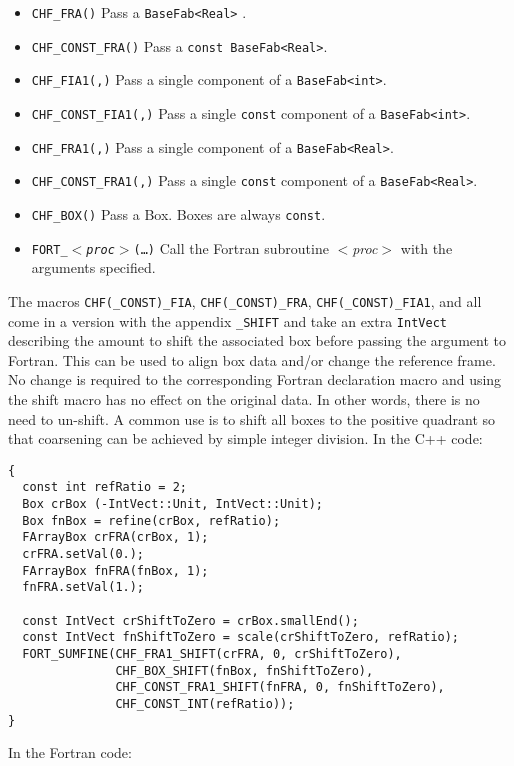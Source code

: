 \begin{itemize}
\item {\tt CHF\_FRA(\argv)} Pass a {\verb/BaseFab<Real>/} .
\item {\tt CHF\_CONST\_FRA(\argv)} Pass a {\verb/const BaseFab<Real>/}.
\item {\tt CHF\_FIA1(\argv,\compv)} Pass a single component of a {\verb/BaseFab<int>/}.
\item {\tt CHF\_CONST\_FIA1(\argv,\compv)} Pass a single {\tt const} component of a {\verb/BaseFab<int>/}.
\item {\tt CHF\_FRA1(\argv,\compv)} Pass a single component of a {\verb/BaseFab<Real>/}.
\item {\tt CHF\_CONST\_FRA1(\argv,\compv)} Pass a single {\tt const} component of a {\verb/BaseFab<Real>/}.
\item {\tt CHF\_BOX(\argv)} Pass a Box.  Boxes are always {\tt const}.
\item {\tt FORT\_$<${\em proc}$>$(\ldots)} Call the Fortran subroutine $<${\em proc}$>$ with the arguments specified.
\end{itemize}

The macros {\tt CHF(\_CONST)\_FIA}, {\tt CHF(\_CONST)\_FRA}, {\tt CHF(\_CONST)\_FIA1}, and all come in a version with the appendix {\tt \_SHIFT} and take an extra {\tt IntVect} describing the amount to shift the associated box before passing the argument to Fortran.  This can be used to align box data and/or change the reference frame.  No change is required to the corresponding Fortran declaration macro and using the shift macro has no effect on the original data.  In other words, there is no need to un-shift.  A common use is to shift all boxes to the positive quadrant so that coarsening can be achieved by simple integer division.  In the C++ code:

\begin{small}
\begin{verbatim}
{
  const int refRatio = 2;
  Box crBox (-IntVect::Unit, IntVect::Unit);
  Box fnBox = refine(crBox, refRatio);
  FArrayBox crFRA(crBox, 1);
  crFRA.setVal(0.);
  FArrayBox fnFRA(fnBox, 1);
  fnFRA.setVal(1.);

  const IntVect crShiftToZero = crBox.smallEnd();
  const IntVect fnShiftToZero = scale(crShiftToZero, refRatio);
  FORT_SUMFINE(CHF_FRA1_SHIFT(crFRA, 0, crShiftToZero),
               CHF_BOX_SHIFT(fnBox, fnShiftToZero),
               CHF_CONST_FRA1_SHIFT(fnFRA, 0, fnShiftToZero),
               CHF_CONST_INT(refRatio));
}
\end{verbatim}
\end{small}
In the Fortran code:

